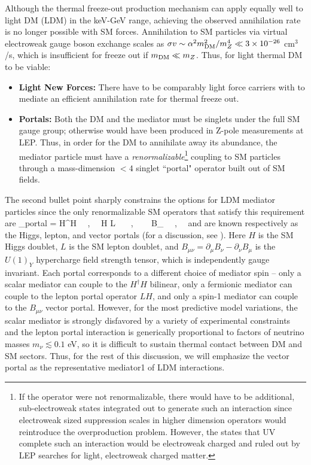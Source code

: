 Although the thermal freeze-out production mechanism can apply equally well to light DM (LDM) in the keV-GeV range, 
achieving the observed annihilation rate is no longer possible with SM forces. Annihilation to SM particles via virtual electroweak gauge boson exchange
scales as $\sigma v \sim \alpha^2 m_{\rm DM}^2/m_Z^4 \ll 3\times 10^{-26} $ cm$^3$/s, which is insufficient for freeze out if $m_{\rm DM} \ll m_{Z}$. Thus,
for light thermal DM to be viable:
\begin{itemize}
\item {\bf Light New Forces:} There have to be comparably light force carriers with to mediate an efficient  annihilation rate 
for thermal freeze out. 
\item {\bf Portals: } Both the DM and the mediator must be singlets under the full SM gauge group; otherwise 
 would have been produced in Z-pole measurements at LEP. Thus, in order for the DM to annihilate away its abundance, the mediator particle 
 must have a {\it renormalizable}\footnote{If the operator were not renormalizable, 
 there would have to be additional, sub-electroweak states integrated out to generate 
 such an interaction since electroweak sized suppression scales in higher dimension operators would reintroduce 
 the overproduction problem. However, the states that UV complete such an interaction would be 
 electroweak charged and ruled out by LEP searches for light, electroweak charged matter. } coupling to SM particles through a mass-dimension $< 4$ singlet ``portal" operator built out of SM fields.
\end{itemize}
The second bullet point sharply constrains the options for LDM mediator particles since the only renormalizable SM operators that
satisfy this requirement are 
\be
{}_{\rm portal}   =  H^\dagger H  ~~,~~   H L ~~~, ~~~ B_{\mu\nu} ~~,~~
\ee
and are known respectively as the Higgs, lepton, and vector portals (for a discussion, see \cite{Pospelov:2008zw}). Here $H$ is the SM Higgs doublet, $L$ is the SM lepton doublet, and 
$B_{\mu \nu } = \partial_\mu B_\nu - \partial_\nu B_\mu$ is the $U(1)_Y$ hypercharge field strength tensor, which is independently gauge invariant. 
Each portal corresponds to a different choice of mediator spin -- only a scalar mediator can couple to the $H^\dagger H$ bilinear, only a fermionic mediator can couple to 
the lepton portal operator $LH$, and only a spin-1 mediator can couple to the $B_{\mu \nu}$ vector portal.
However, for the most predictive model variations, the scalar mediator is strongly disfavored by a variety of experimental constraints \cite{Krnjaic:2015mbs} 
and the lepton portal interaction is generically proportional to factors of neutrino masses $m_\nu \lesssim 0.1$ eV, so it is difficult to sustain 
thermal contact between DM and SM sectors. Thus, for the rest of this discussion, we will emphasize the vector portal as the representative mediator1
of LDM interactions. 

